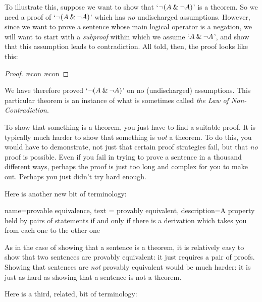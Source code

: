         To illustrate this, suppose we want to show that `${\neg} (A \mathbin{\&} {\neg} A)$' is a theorem.  So we need a proof of `${\neg}(A \mathbin{\&} {\neg} A)$' which has \emph{no} undischarged assumptions. However, since we want to prove a sentence whose main logical operator is a negation, we will want to start with a \emph{subproof} within which we assume `$A \mathbin{\&} {\neg} A$', and show that this assumption leads to contradiction. All told, then, the proof looks like this:
	\begin{proof}
		\open
			\ae{con}
			\ae{con}
		\close
	\end{proof}
We have therefore proved `${\neg} (A \mathbin{\&} {\neg} A)$' on no (undischarged) assumptions. This particular theorem is an instance of what is sometimes called \emph{the Law of Non-Contradiction}.

To show that something is a theorem, you just have to find a suitable proof. It is typically much harder to show that something is \emph{not} a theorem. To do this, you would have to demonstrate, not just that certain proof strategies fail, but that \emph{no} proof is possible. Even if you fail in trying to prove a sentence in a thousand different ways, perhaps the proof is just too long and complex for you to make out. Perhaps you just didn't try hard enough.

Here is another new bit of terminology:
        
{
  name=provable equivalence,
  text = provably equivalent,
description={A property held by pairs of statements if and only if there is a derivation which takes you from each one to the other one}
}


As in the case of showing that a sentence is a theorem, it is relatively easy to show that two sentences are provably equivalent: it just requires a pair of proofs. Showing that sentences are \emph{not} provably equivalent would be much harder: it is just as hard as showing that a sentence is not a theorem. 

Here is a third, related, bit of terminology:
        
